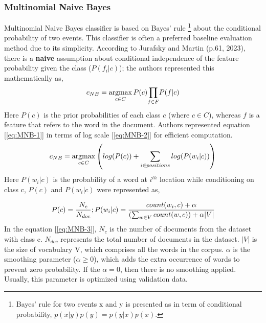 \documentclass[11pt]{article}
\begin{document}
\subsubsection{Multinomial Naive Bayes}
Multinomial Naive Bayes classifier is based on Bayes' rule \cite{bayes}\footnote{Bayes' rule for two events x and y is presented as in term of conditional probability, $p(x|y)p(y)=p(y|x)p(x)$.} about the conditional probability of two events. This classifier is often a preferred  baseline evaluation method due to its simplicity. According to Jurafsky and Martin (p.61, 2023), there is a \textbf{naive} assumption about conditional independence of the feature probability given the class ($P(f_i|c)$); the authors represented this mathematically as,   
\begin{equation}
\small 
\label{eq:MNB-1}
c_{NB} = \underset{c\in C}{\mathrm{argmax}} 
\, P(c) \underset{f \in F}{\prod}P(f|c)
\end{equation}
Here $P(c)$ is the prior probabilities of each class $c$ (where $c \in C$), whereas $f$ is a feature that refers to the word in the document. Authors represented equation [\ref{eq:MNB-1}] in terms of log scale [\ref{eq:MNB-2}] for efficient computation.
\begin{equation}
  \label{eq:MNB-2}
  \small
  c_{NB}=\underset{c\in C}{\mathrm{argmax}} \left(log(P(c))+ \sum_{i\in positions}log(P(w_i|c))\right)
\end{equation}
Here $P(w_i|c)$ is the probability of a word at $i^{th}$ location while conditioning on class c, $P(c)$ and $P(w_i|c)$ were represented as,

\begin{equation}
\label{eq:MNB-3}
\small
P(c)=\frac{N_c}{N_{doc}};P(w_i|c)=\frac{count(w_i,c)+\alpha}{(\sum_{w \in V}count(w,c))+\alpha |V|}
\end{equation}
In the equation [\ref{eq:MNB-3}], $N_c$ is the number of documents from the dataset with class c. $N_{doc}$ represents the total number of documents in the dataset. $|V|$ is the size of vocabulary V, which comprises all the words in the corpus. $\alpha$ is the smoothing parameter ($\alpha \ge 0$), which adds the extra occurrence of words to prevent zero probability. If the $\alpha=0$, then there is no smoothing applied. Usually, this parameter is optimized using validation data. 
\end{document}
